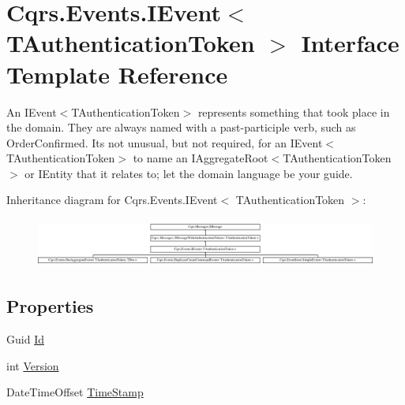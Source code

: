 \hypertarget{interfaceCqrs_1_1Events_1_1IEvent}{}\section{Cqrs.\+Events.\+I\+Event$<$ T\+Authentication\+Token $>$ Interface Template Reference}
\label{interfaceCqrs_1_1Events_1_1IEvent}


An I\+Event$<$\+T\+Authentication\+Token$>$ represents something that took place in the domain. They are always named with a past-\/participle verb, such as Order\+Confirmed. It\textquotesingle{}s not unusual, but not required, for an I\+Event$<$\+T\+Authentication\+Token$>$ to name an I\+Aggregate\+Root$<$\+T\+Authentication\+Token$>$ or I\+Entity that it relates to; let the domain language be your guide.  


Inheritance diagram for Cqrs.\+Events.\+I\+Event$<$ T\+Authentication\+Token $>$\+:\begin{figure}[H]
\begin{center}
\leavevmode
\includegraphics[height=1.651917cm]{interfaceCqrs_1_1Events_1_1IEvent}
\end{center}
\end{figure}
\subsection*{Properties}
\begin{DoxyCompactItemize}
\item 
Guid \hyperlink{interfaceCqrs_1_1Events_1_1IEvent_a2974e13d307c62c5cc438d668ff1783b}{Id}
\item 
int \hyperlink{interfaceCqrs_1_1Events_1_1IEvent_a2754e056f483b9a8e59622a363276b15}{Version}
\item 
Date\+Time\+Offset \hyperlink{interfaceCqrs_1_1Events_1_1IEvent_a149d6ea1652cbcc63dbc45eaa71fade0}{Time\+Stamp}
\end{DoxyCompactItemize}


